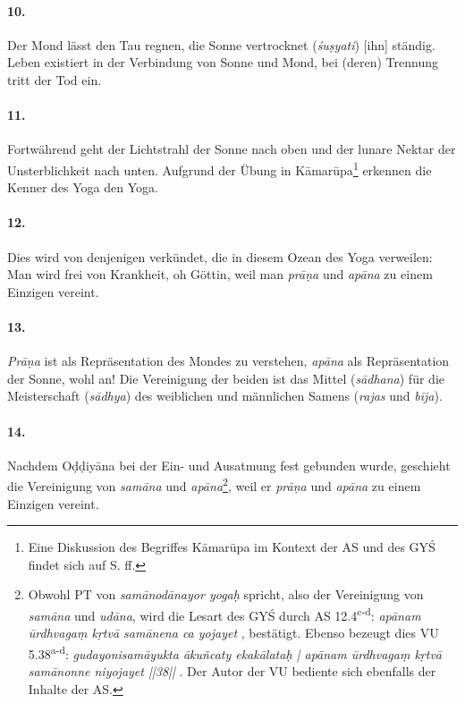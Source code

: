 \documentclass[a4paper,12pt]{article}
\begin{document}
\paragraph{10.} Der Mond lässt den Tau regnen, die Sonne vertrocknet (\textit{śuṣyati}) [ihn] ständig. Leben existiert in der Verbindung von Sonne und Mond, bei (deren) Trennung tritt der Tod ein. 

\paragraph{11.} Fortwährend geht der Lichtstrahl der Sonne nach oben und der lunare Nektar der Unsterblichkeit nach unten. Aufgrund der Übung in Kāmarūpa\footnote{Eine Diskussion des Begriffes Kāmarūpa im Kontext der AS und des GYŚ findet sich auf S.\pageref{kamarupa} ff.} erkennen die Kenner des Yoga den Yoga. 

\paragraph{12.} Dies wird von denjenigen verkündet, die in diesem Ozean des Yoga verweilen: Man wird frei von Krankheit, oh Göttin, weil man \textit{prāṇa} und \textit{apāna} zu einem Einzigen vereint.

\paragraph{13.} \textit{Prāṇa} ist als Repräsentation des Mondes zu verstehen, \textit{apāna} als Repräsentation der Sonne, wohl an! Die Vereinigung der beiden ist das Mittel (\textit{sādhana}) für die Meisterschaft (\textit{sādhya}) des weiblichen und männlichen Samens (\textit{rajas} und \textit{bīja}). 

\paragraph{14.} Nachdem Oḍḍiyāna bei der Ein- und Ausatmung fest gebunden wurde, geschieht die Vereinigung von \textit{samāna} und \textit{apāna}\footnote{Obwohl PT von \textit{samānodānayor yogaḥ} spricht, also der Vereinigung von \textit{samāna} und \textit{udāna}, wird die Lesart des GYŚ durch AS 12.4\textsuperscript{c-d}: \textit{apānam ūrdhvagaṃ kṛtvā samānena ca yojayet} \parencite[17]{asiddhi}, bestätigt. Ebenso bezeugt dies VU 5.38\textsuperscript{a-d}: \textit{gudayonisamāyukta ākuñcaty ekakālataḥ | apānam ūrdhvagaṃ kṛtvā samānonne niyojayet ||38||} \parencite[17]{varahaupanishad}. Der Autor der VU bediente sich ebenfalls der Inhalte der AS.}, weil er \textit{prāṇa} und \textit{apāna} zu einem Einzigen vereint. 
\end{document}
